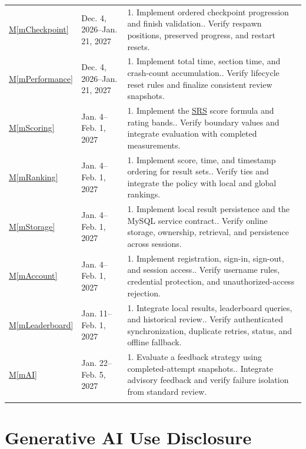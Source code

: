 \documentclass[12pt, titlepage]{article}
\DeclareRobustCommand{\mgabbr}[2]{\hyperlink{mg-abbr:#1}{#2}}
\newcommand{\mref}[1]{\hyperref[#1]{M\ref*{#1}}}
\begin{document}
\begin{longtable}{p{} p{} p{}}
\addlinespace
\mref{mCheckpoint} & Dec. 4, 2026--Jan. 21, 2027
& 1. Implement ordered checkpoint progression and finish validation.\newline
  2. Verify respawn positions, preserved progress, and restart resets. \\
\addlinespace
\mref{mPerformance} & Dec. 4, 2026--Jan. 21, 2027
& 1. Implement total time, section time, and crash-count accumulation.\newline
  2. Verify lifecycle reset rules and finalize consistent review snapshots. \\
\addlinespace
\mref{mScoring} & Jan. 4--Feb. 1, 2027
& 1. Implement the \mgabbr{srs}{SRS} score formula and rating bands.\newline
  2. Verify boundary values and integrate evaluation with completed
  measurements. \\
\addlinespace
\mref{mRanking} & Jan. 4--Feb. 1, 2027
& 1. Implement score, time, and timestamp ordering for result sets.\newline
  2. Verify ties and integrate the policy with local and global rankings. \\
\addlinespace
\mref{mStorage} & Jan. 4--Feb. 1, 2027
& 1. Implement local result persistence and the MySQL service contract.\newline
  2. Verify online storage, ownership, retrieval, and persistence across
  sessions. \\
\addlinespace
\mref{mAccount} & Jan. 4--Feb. 1, 2027
& 1. Implement registration, sign-in, sign-out, and session access.\newline
  2. Verify username rules, credential protection, and unauthorized-access
  rejection. \\
\addlinespace
\mref{mLeaderboard} & Jan. 11--Feb. 1, 2027
& 1. Integrate local results, leaderboard queries, and historical
review.\newline
  2. Verify authenticated synchronization, duplicate retries, status, and
  offline fallback. \\
\addlinespace
\mref{mAI} & Jan. 22--Feb. 5, 2027
& 1. Evaluate a feedback strategy using completed-attempt snapshots.\newline
  2. Integrate advisory feedback and verify failure isolation from standard
  review. \\
\addlinespace
\end{longtable}
\endgroup

\section{Generative AI Use Disclosure}
\end{document}
